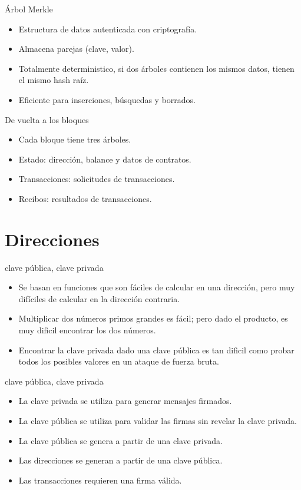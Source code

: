 \documentclass[10pt]{beamer}
\begin{document}
\begin{frame}{Árbol Merkle}
  \begin{itemize}
    \item Estructura de datos autenticada con criptografía.
    \item Almacena parejas (clave, valor).
    \item Totalmente deterministico, si dos árboles contienen los mismos datos, tienen el mismo hash raíz.
    \item Eficiente para inserciones, búsquedas y borrados.
  \end{itemize}
\end{frame}

\begin{frame}{De vuelta a los bloques}
  \begin{itemize}
    \item Cada bloque tiene tres árboles.
    \item Estado: dirección, balance y datos de contratos.
    \item Transacciones: solicitudes de transacciones.
    \item Recibos: resultados de transacciones.
  \end{itemize}
\end{frame}

\section{Direcciones}

\begin{frame}{clave pública, clave privada}
  \begin{itemize}
    \item Se basan en funciones que son fáciles de calcular en una dirección, pero muy difíciles de calcular en la dirección contraria.
     \item Multiplicar dos números primos grandes es fácil; pero dado el producto, es muy dificil encontrar los dos números.
    \item Encontrar la clave privada dado una clave pública es tan dificil como probar todos los posibles valores en un ataque de fuerza bruta.
  \end{itemize}
\end{frame}

\begin{frame}{clave pública, clave privada}
  \begin{itemize}
    \item La clave privada se utiliza para generar mensajes firmados.
    \item La clave pública se utiliza para validar las firmas sin revelar la clave privada.
    \item La clave pública se genera a partir de una clave privada.
    \item Las direcciones se generan a partir de una clave pública.
    \item Las transacciones requieren una firma válida.
  \end{itemize}
\end{frame}
\end{document}
